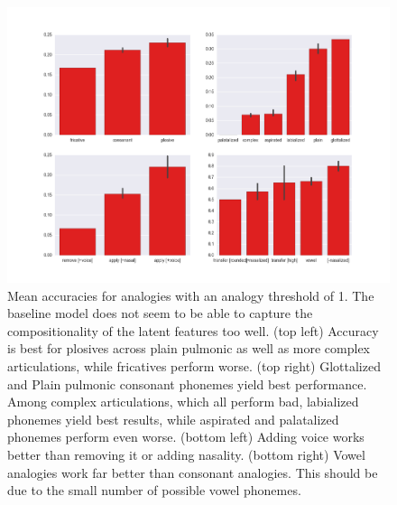 \documentclass[11pt]{article}
\begin{document}
\begin{figure}[h!] %
   \centering
   \includegraphics[width=\textwidth]{detailed_evaluation_topn1} 
   \caption{Mean accuracies for analogies with an analogy threshold of 1. The baseline model does not seem to be able to capture the compositionality of the latent features too well. (top left) Accuracy is best for plosives across plain pulmonic as well as more complex articulations, while fricatives perform worse. (top right) Glottalized and Plain pulmonic consonant phonemes yield best performance. Among complex articulations, which all perform bad,  labialized phonemes yield best results, while aspirated and palatalized phonemes perform even worse. (bottom left) Adding voice works better than removing it or adding nasality. (bottom right) Vowel analogies work far better than consonant analogies. This should be due to the small number of possible vowel phonemes.}
   \label{fig:detailed_evaluation_consonants_topn1}
\end{figure}
\end{document}

